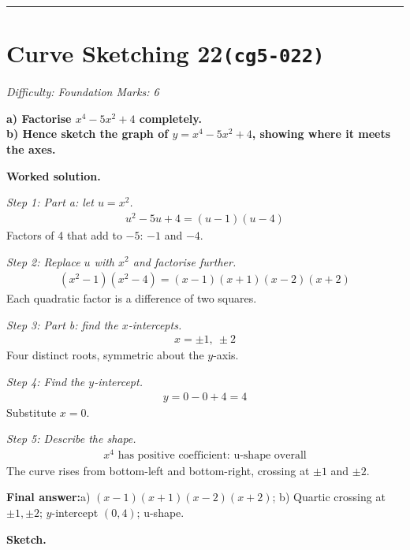 \documentclass[11pt]{article}
\newcommand{\question}[1]{\par\medskip\noindent\textbf{#1}\par}
\begin{document}
\medskip\hrule

\section*{Curve Sketching 22\quad\small\texttt{(cg5-022)}}
\textit{Difficulty: Foundation \quad\textbar\quad Marks: 6}

\question{a) Factorise \( x^4 - 5x^2 + 4 \) completely. \\[3pt] b) Hence sketch the graph of \( y = x^4 - 5x^2 + 4 \), showing where it meets the axes.}

\textbf{Worked solution.}

\textit{Step 1: Part a: let \( u = x^2 \).}
\[\begin{gathered}
u^2 - 5u + 4 = (u-1)(u-4)
\end{gathered}\]
Factors of 4 that add to \(-5\): \(-1\) and \(-4\).

\textit{Step 2: Replace \( u \) with \( x^2 \) and factorise further.}
\[\begin{gathered}
(x^2 - 1)(x^2 - 4) = (x-1)(x+1)(x-2)(x+2)
\end{gathered}\]
Each quadratic factor is a difference of two squares.

\textit{Step 3: Part b: find the \( x \)-intercepts.}
\[\begin{gathered}
x = \pm 1,\ \pm 2
\end{gathered}\]
Four distinct roots, symmetric about the \( y \)-axis.

\textit{Step 4: Find the \( y \)-intercept.}
\[\begin{gathered}
y = 0 - 0 + 4 = 4
\end{gathered}\]
Substitute \( x = 0 \).

\textit{Step 5: Describe the shape.}
\[\begin{gathered}
x^4 \text{ has positive coefficient: u-shape overall}
\end{gathered}\]
The curve rises from bottom-left and bottom-right, crossing at \( \pm 1 \) and \( \pm 2 \).

\begin{answerbox}
\textbf{Final answer:}\quad a) \(\displaystyle (x-1)(x+1)(x-2)(x+2)\); b) Quartic crossing at \(\displaystyle \pm 1, \pm 2\); \(\displaystyle y\)-intercept \(\displaystyle (0, 4)\); u-shape.
\end{answerbox}
\textbf{Sketch.}
\end{document}

